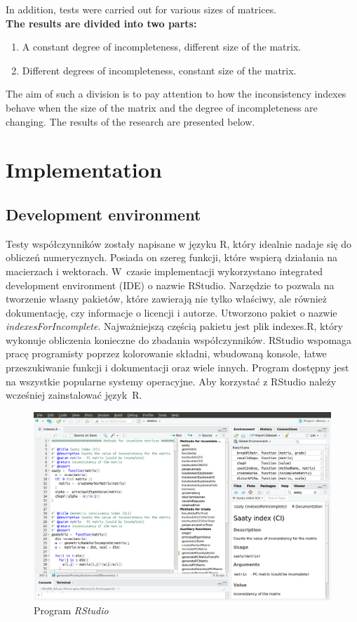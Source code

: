 In addition, tests were carried out for various sizes of matrices.\\
\textbf{The results are divided into two parts:}
\begin{enumerate}
  \item A constant degree of incompleteness, different size of the matrix.
  \item Different degrees of incompleteness, constant size of the matrix.
\end{enumerate}

The aim of such a division is to pay attention to how the inconsistency indexes behave when the size of the matrix and the degree of incompleteness are changing. The results of the research are presented below.


\section{Implementation}

\subsection{Development environment}
Testy współczynników zostały napisane w języku R, który idealnie nadaje się do obliczeń numerycznych. Posiada on szereg funkcji, które wspierą działania na macierzach i wektorach. W~czasie implementacji wykorzystano integrated development environment (IDE) o nazwie RStudio. Narzędzie to pozwala na tworzenie własny pakietów, które zawierają nie tylko właściwy, ale również dokumentację, czy informacje o licencji i autorze. Utworzono pakiet o nazwie \textit{indexesForIncomplete}. Najważniejszą częścią pakietu jest plik indexes.R, który wykonuje obliczenia konieczne do zbadania współczynników. RStudio wspomaga pracę programisty poprzez kolorowanie składni, wbudowaną konsole, łatwe przeszukiwanie funkcji i dokumentacji oraz wiele innych. Program dostępny jest na wszystkie popularne systemy operacyjne. Aby korzystać z RStudio należy wcześniej zainstalować język~R.
\begin{figure}[ht]
\centerline{\includegraphics[width=\textwidth]{images/rstudio.png}}
\caption{Program \textit{RStudio}}
\label{fig:rstudio}
\end{figure}


